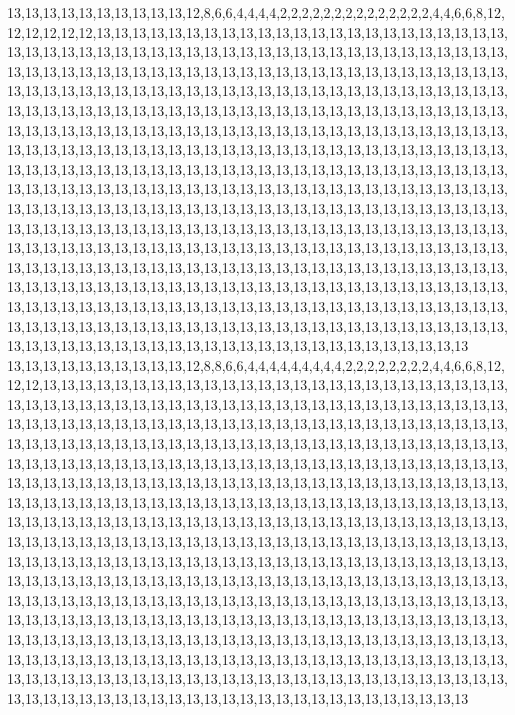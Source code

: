 13,13,13,13,13,13,13,13,13,13,12,8,6,6,4,4,4,4,2,2,2,2,2,2,2,2,2,2,2,2,2,2,4,4,6,6,8,12,12,12,12,12,12,13,13,13,13,13,13,13,13,13,13,13,13,13,13,13,13,13,13,13,13,13,13,13,13,13,13,13,13,13,13,13,13,13,13,13,13,13,13,13,13,13,13,13,13,13,13,13,13,13,13,13,13,13,13,13,13,13,13,13,13,13,13,13,13,13,13,13,13,13,13,13,13,13,13,13,13,13,13,13,13,13,13,13,13,13,13,13,13,13,13,13,13,13,13,13,13,13,13,13,13,13,13,13,13,13,13,13,13,13,13,13,13,13,13,13,13,13,13,13,13,13,13,13,13,13,13,13,13,13,13,13,13,13,13,13,13,13,13,13,13,13,13,13,13,13,13,13,13,13,13,13,13,13,13,13,13,13,13,13,13,13,13,13,13,13,13,13,13,13,13,13,13,13,13,13,13,13,13,13,13,13,13,13,13,13,13,13,13,13,13,13,13,13,13,13,13,13,13,13,13,13,13,13,13,13,13,13,13,13,13,13,13,13,13,13,13,13,13,13,13,13,13,13,13,13,13,13,13,13,13,13,13,13,13,13,13,13,13,13,13,13,13,13,13,13,13,13,13,13,13,13,13,13,13,13,13,13,13,13,13,13,13,13,13,13,13,13,13,13,13,13,13,13,13,13,13,13,13,13,13,13,13,13,13,13,13,13,13,13,13,13,13,13,13,13,13,13,13,13,13,13,13,13,13,13,13,13,13,13,13,13,13,13,13,13,13,13,13,13,13,13,13,13,13,13,13,13,13,13,13,13,13,13,13,13,13,13,13,13,13,13,13,13,13,13,13,13,13,13,13,13,13,13,13,13,13,13,13,13,13,13,13,13,13,13,13,13,13,13,13,13,13,13,13,13,13,13,13,13,13,13,13,13,13,13,13,13,13,13,13,13,13,13,13,13,13,13,13,13,13,13,13,13,13,13,13,13,13,13,13,13,13,13,13,13,13,13,13,13,13,13,13,13,13,13,13,13,13,13,13,13,13,13,13,13,13,13,13,13,13,13,13,13,13,13,13,13,13,13,13,13,13,13,13,13,13,13,13,13,13,13,13,13,13,13,13,13,13,13
13,13,13,13,13,13,13,13,13,13,12,8,8,6,6,4,4,4,4,4,4,4,4,4,2,2,2,2,2,2,2,2,4,4,6,6,8,12,12,12,13,13,13,13,13,13,13,13,13,13,13,13,13,13,13,13,13,13,13,13,13,13,13,13,13,13,13,13,13,13,13,13,13,13,13,13,13,13,13,13,13,13,13,13,13,13,13,13,13,13,13,13,13,13,13,13,13,13,13,13,13,13,13,13,13,13,13,13,13,13,13,13,13,13,13,13,13,13,13,13,13,13,13,13,13,13,13,13,13,13,13,13,13,13,13,13,13,13,13,13,13,13,13,13,13,13,13,13,13,13,13,13,13,13,13,13,13,13,13,13,13,13,13,13,13,13,13,13,13,13,13,13,13,13,13,13,13,13,13,13,13,13,13,13,13,13,13,13,13,13,13,13,13,13,13,13,13,13,13,13,13,13,13,13,13,13,13,13,13,13,13,13,13,13,13,13,13,13,13,13,13,13,13,13,13,13,13,13,13,13,13,13,13,13,13,13,13,13,13,13,13,13,13,13,13,13,13,13,13,13,13,13,13,13,13,13,13,13,13,13,13,13,13,13,13,13,13,13,13,13,13,13,13,13,13,13,13,13,13,13,13,13,13,13,13,13,13,13,13,13,13,13,13,13,13,13,13,13,13,13,13,13,13,13,13,13,13,13,13,13,13,13,13,13,13,13,13,13,13,13,13,13,13,13,13,13,13,13,13,13,13,13,13,13,13,13,13,13,13,13,13,13,13,13,13,13,13,13,13,13,13,13,13,13,13,13,13,13,13,13,13,13,13,13,13,13,13,13,13,13,13,13,13,13,13,13,13,13,13,13,13,13,13,13,13,13,13,13,13,13,13,13,13,13,13,13,13,13,13,13,13,13,13,13,13,13,13,13,13,13,13,13,13,13,13,13,13,13,13,13,13,13,13,13,13,13,13,13,13,13,13,13,13,13,13,13,13,13,13,13,13,13,13,13,13,13,13,13,13,13,13,13,13,13,13,13,13,13,13,13,13,13,13,13,13,13,13,13,13,13,13,13,13,13,13,13,13,13,13,13,13,13,13,13,13,13,13,13,13,13,13,13,13,13,13,13,13,13,13,13,13,13,13,13,13,13,13,13,13,13,13,13
